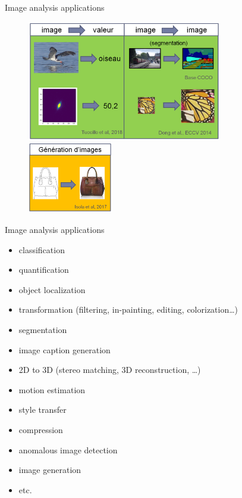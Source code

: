 \documentclass[xcolor=pdftex,dvipsnames,table,mathserif]{beamer}
\begin{document}
\begin{frame}{Image analysis applications}

  \begin{figure}[ht]
    \centering
    \includegraphics[width=0.76\textwidth]{applis_dl_sup}
    \includegraphics[width=0.33\textwidth]{applis_dl_nonsup}
  \end{figure}


\end{frame}


\begin{frame}{Image analysis applications}

  \begin{itemize}
  \item classification
  \item quantification
  \item object localization
  \item transformation (filtering, in-painting, editing, colorization…)
  \item segmentation
  \item image caption generation
  \item 2D to 3D (stereo matching, 3D reconstruction, …)
  \item motion estimation
  \item style transfer
  \item compression
  \item anomalous image detection
  \item image generation
  \item etc.
  \end{itemize}

\end{frame}
\end{document}

